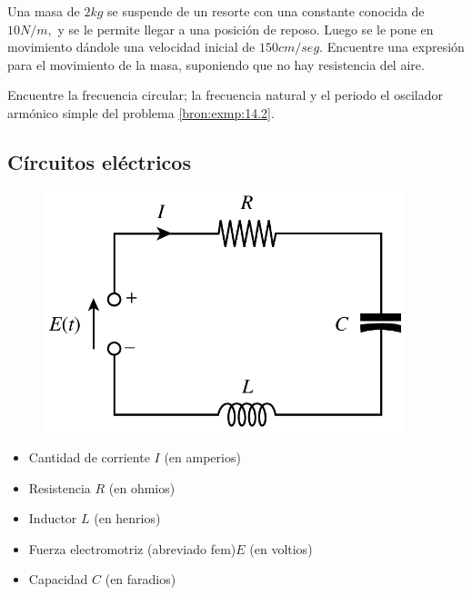 \begin{problema}
	\label{bron:exmp:14.2}
	Una masa de $2kg$ se suspende de un resorte con una constante conocida de $10N/m,$ y se le permite llegar a una posici\'on de reposo. Luego se le pone en movimiento dándole una velocidad inicial de $150cm/seg.$ Encuentre una expresi\'on para el movimiento de la masa, suponiendo que no hay resistencia del aire.
\end{problema}




\begin{problema}
	Encuentre la frecuencia circular; la frecuencia natural y el periodo el oscilador arm\'onico simple del problema \ref{bron:exmp:14.2}.
\end{problema}



\subsection{Círcuitos eléctricos}


\begin{figure}
	\includegraphics[height=7cm,keepaspectratio=true]{./edo/circuitos_electricos.png}
	\label{fig:circuitos}
\end{figure}



{}
\begin{itemize}
	\item Cantidad de corriente $I$ (en amperios)
	\item Resistencia $R$ (en ohmios)
	\item Inductor $L$ (en henrios)
	\item Fuerza electromotriz (abreviado fem)$E$ (en voltios)
	\item Capacidad $C$ (en faradios)
\end{itemize}


